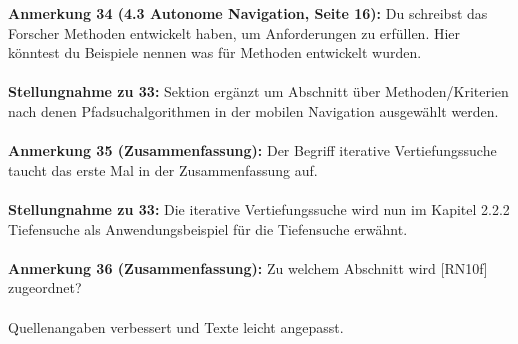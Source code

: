 \documentclass[a4paper,12pt]{book}
\begin{document}
\textbf{Anmerkung 34 (4.3 Autonome Navigation, Seite 16):}
Du schreibst das Forscher Methoden entwickelt haben, um Anforderungen zu erfüllen. Hier könntest du Beispiele nennen was für Methoden entwickelt wurden. 
\\ \\
\textbf{Stellungnahme zu 33:}
Sektion ergänzt um Abschnitt über Methoden/Kriterien nach denen Pfadsuchalgorithmen in der mobilen Navigation ausgewählt werden.
\\ \\
\textbf{Anmerkung 35 (Zusammenfassung):}
Der Begriff iterative Vertiefungssuche taucht das erste Mal in der Zusammenfassung auf. 
\\ \\
\textbf{Stellungnahme zu 33:}
Die iterative Vertiefungssuche wird nun im Kapitel 2.2.2 Tiefensuche als Anwendungsbeispiel für die Tiefensuche erwähnt.
\\ \\
\textbf{Anmerkung 36 (Zusammenfassung):}
Zu welchem Abschnitt wird [RN10f] zugeordnet?
\\ \\
Quellenangaben verbessert und Texte leicht angepasst.
\\ \\
\end{document}
